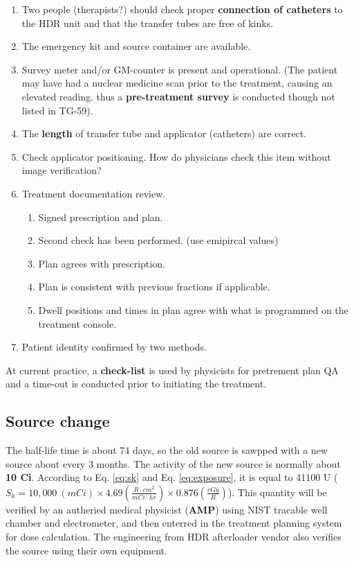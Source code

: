 \documentclass[]{book}
\providecommand{\tightlist}{%
  \setlength{\itemsep}{0pt}\setlength{\parskip}{0pt}}
\theoremstyle{definition}
\theoremstyle{definition}
\theoremstyle{definition}
\theoremstyle{remark}
\begin{document}
\begin{enumerate}
\def\labelenumi{\arabic{enumi}.}
\tightlist
\item
  Two people (therapists?) should check proper \textbf{connection of
  catheters} to the HDR unit and that the transfer tubes are free of
  kinks.
\item
  The emergency kit and source container are available.
\item
  Survey meter and/or GM-counter is present and operational. (The
  patient may have had a nuclear medicine scan prior to the treatment,
  causing an elevated reading. thus a \textbf{pre-treatment survey} is
  conducted though not listed in TG-59).
\item
  The \textbf{length} of transfer tube and applicator (catheters) are
  correct.
\item
  Check applicator positioning. How do physicians check this item
  without image verification?
\item
  Treatment documentation review.

  \begin{enumerate}
  \def\labelenumii{\alph{enumii}.}
  \tightlist
  \item
    Signed prescription and plan.
  \item
    Second check has been performed. (use emipircal values)
  \item
    Plan agrees with prescription.
  \item
    Plan is consistent with previous fractions if applicable.
  \item
    Dwell positions and times in plan agree with what is programmed on
    the treatment console.
  \end{enumerate}
\item
  Patient identity confirmed by two methods.
\end{enumerate}

At current practice, a \textbf{check-list} is used by physicists for
pretrement plan QA and a time-out is conducted prior to initiating the
treatment.

\subsection{Source change}\label{hdr-source-change}

The half-life time is about 74 days, so the old source is sawpped with a
new source about every 3 months. The activity of the new source is
normally about \textbf{10 Ci}. According to Eq. \eqref{eq:sk} and Eq.
\eqref{eq:exposure}, it is equal to 41100 U
(\(S_k = 10,000\ (mCi) \times 4.69 \left(\frac{{R\cdot cm}^2}{mCi\cdot hr} \right) \times 0.876 \left(\frac{cGy}{R}\right)\)).
This quantity will be verified by an autheried medical physicist
(\textbf{AMP}) using NIST tracable well chamber and electrometer, and
then enterred in the treatment planning system for dose calculation. The
engineering from HDR afterloader vendor also verifies the source using
their own equipment.
\end{document}
